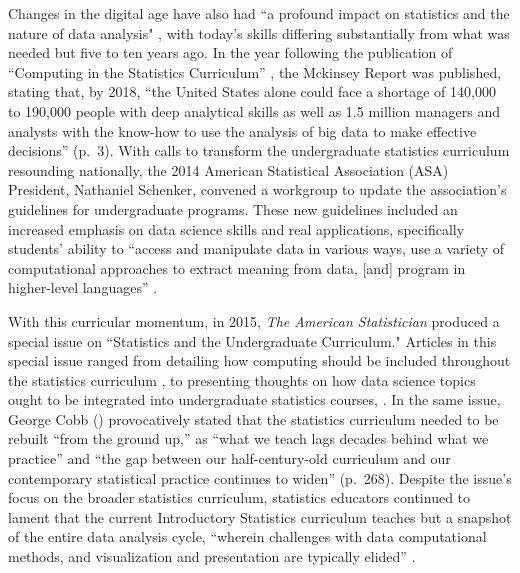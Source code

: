 \documentclass[12pt]{article}
\begin{document}
\noindent Changes in the digital age have also had ``a profound impact on statistics
and the nature of data analysis" \citep[p.\ 97]{nolan}, with today's skills 
differing substantially from what was needed but five to ten years ago. 
In the year following the publication of ``Computing in the Statistics 
Curriculum'' \citep{nolan}, the Mckinsey Report \citep{mckinsey} was published, 
stating that, by 2018, ``the United States alone could face a
shortage of 140,000 to 190,000 people with deep analytical skills as well as 1.5
million managers and analysts with the know-how to use the analysis of big data
to make effective decisions'' (p.\ 3). With calls to transform the undergraduate
statistics curriculum resounding nationally, the 2014 American Statistical 
Association (ASA) President, Nathaniel Schenker, convened a workgroup to update
the association's guidelines for undergraduate programs. These new guidelines 
included an increased emphasis on data science skills and real applications, 
specifically students' ability to ``access and manipulate data in various ways,
use a variety of computational approaches to extract meaning from data, [and] 
program in higher-level languages'' \citep[p.\ 7]{asa}. 

\quad With this curricular momentum, in 2015, \emph{The American Statistician} 
produced a special issue on ``Statistics and the Undergraduate Curriculum." 
Articles in this special issue ranged from detailing how computing should be
included throughout the statistics curriculum \citep{jenny, tintle, hesterberg},
to presenting thoughts on how data science topics ought to be integrated into 
undergraduate statistics courses, \citep{esr, grimshaw, 
baumer_datascience, hardin}. In the same issue, George Cobb (\citeyear{cobb}) 
provocatively stated that the statistics curriculum needed to be rebuilt ``from
the ground up,'' as ``what we teach lags decades behind what we practice'' and 
``the gap between our half-century-old curriculum and our contemporary 
statistical practice continues to widen'' (p.\ 268). Despite the 
issue's focus on the broader statistics curriculum, statistics educators
continued to lament that the current Introductory Statistics curriculum teaches
but a snapshot of the entire data analysis cycle, ``wherein challenges with data
computational methods, and visualization and presentation are typically elided'' 
\citep[p.\ 336]{baumer_datascience}. 
\end{document}
